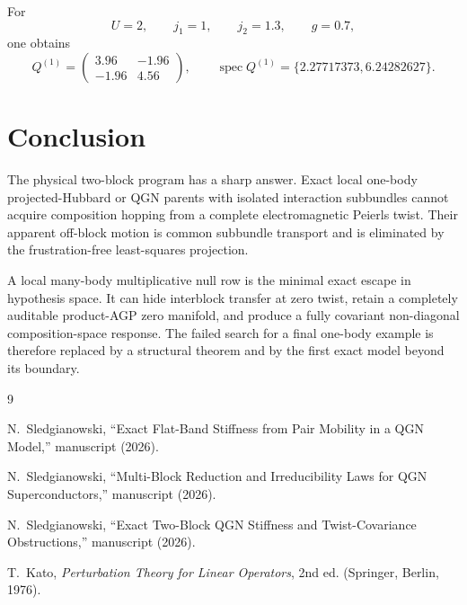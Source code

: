\documentclass[11pt]{article}
\theoremstyle{remark}
\begin{document}
For
\begin{equation}
 U=2,
 \qquad j_1=1,
 \qquad j_2=1.3,
 \qquad g=0.7,
\end{equation}
one obtains
\begin{equation}
 Q^{(1)}=
 \begin{pmatrix}
 3.96&-1.96\\
 -1.96&4.56
 \end{pmatrix},
 \qquad
 \operatorname{spec}Q^{(1)}
 =\{2.27717373,6.24282627\}.
\end{equation}

\section{Conclusion}

The physical two-block program has a sharp answer.  Exact local one-body
projected-Hubbard or QGN parents with isolated interaction subbundles cannot
acquire composition hopping from a complete electromagnetic Peierls twist.
Their apparent off-block motion is common subbundle transport and is
eliminated by the frustration-free least-squares projection.

A local many-body multiplicative null row is the minimal exact escape in
hypothesis space.  It can hide interblock transfer at zero twist, retain a
completely auditable product-AGP zero manifold, and produce a fully covariant
non-diagonal composition-space response.  The failed search for a final
one-body example is therefore replaced by a structural theorem and by the
first exact model beyond its boundary.

\begin{thebibliography}{9}

N.~Sledgianowski,
``Exact Flat-Band Stiffness from Pair Mobility in a QGN Model,''
manuscript (2026).

N.~Sledgianowski,
``Multi-Block Reduction and Irreducibility Laws for QGN Superconductors,''
manuscript (2026).

N.~Sledgianowski,
``Exact Two-Block QGN Stiffness and Twist-Covariance Obstructions,''
manuscript (2026).

T.~Kato,
\emph{Perturbation Theory for Linear Operators}, 2nd ed.
(Springer, Berlin, 1976).

\end{thebibliography}
\end{document}
